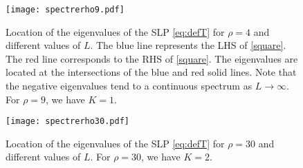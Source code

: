 \documentclass[11pt]{article}
\theoremstyle{plain}
\begin{document}
\begin{figure}[h!]
\begin{center}
\captionsetup{width=.9\linewidth}
\texttt{[image: spectrerho9.pdf]}
\caption{Location of the eigenvalues of the SLP \eqref{eq:defT} for $\rho=4$ and different values of $L$. The blue line represents the LHS of \eqref{square}.  The red line corresponds to the RHS of \eqref{square}. The eigenvalues are located at the intersections of the blue and red solid lines. Note that the negative eigenvalues tend to a continuous spectrum as $L\to\infty$. For $\rho=9$, we have $K=1$.} 
\label{fig:1}
\end{center}
\end{figure}

\begin{figure}[h!]
\captionsetup{width=.9\linewidth}
\begin{center}
\texttt{[image: spectrerho30.pdf]} \caption{Location of the eigenvalues of the SLP \eqref{eq:defT} for $\rho=30$ and different values of $L$.  For $\rho=30$, we have $K=2$.} 
\label{fig:2}
\end{center}
\end{figure}
\end{document}
